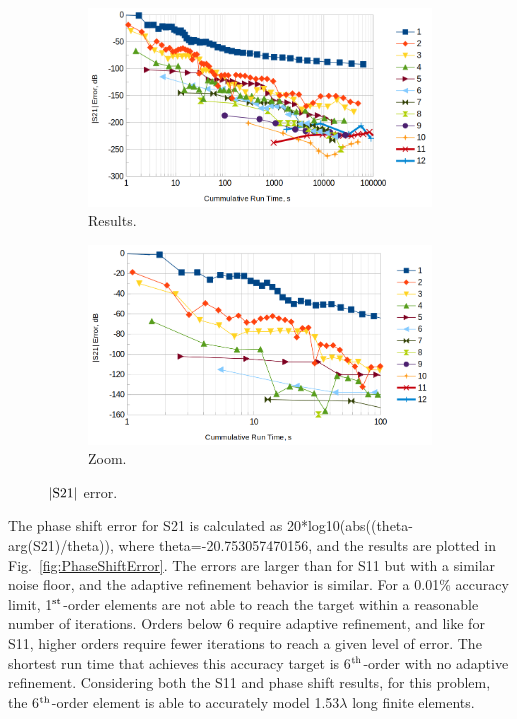 \documentclass[titlepage]{article}
\renewcommand\_{\textunderscore\linebreak[1]}
\begin{document}
\begin{figure}[H]
  \centering
  \begin{subfigure}[t]{0.49\textwidth}
     \includegraphics[width=1\linewidth]{../regression/OpenParEM3D/WR90/straight_study/screenshots/S21Error}
     \caption{Results.}
  \end{subfigure}
  \begin{subfigure}[t]{0.49\textwidth}
     \includegraphics[width=1\linewidth]{../regression/OpenParEM3D/WR90/straight_study/screenshots/S21ErrorZoom}
     \caption{Zoom.}
  \end{subfigure}
  \caption{$|\textnormal{S21}|$ error.}
  \label{fig:S21Error}
\end{figure}

The phase shift error for S21 is calculated as 20*log10(abs((theta-arg(S21)/theta)), where \newline theta=-20.753057470156, and the results are plotted in Fig.~\ref{fig:PhaseShiftError}.  The errors are larger than for S11 but with a similar noise floor, and the adaptive refinement behavior is similar.  For a 0.01\% accuracy limit, 1$^{\textnormal{st}}$-order elements are not able to reach the target within a reasonable number of iterations.  Orders below 6 require adaptive refinement, and like for S11, higher orders require fewer iterations to reach a given level of error.  The shortest run time that achieves this accuracy target is 6$^{\textnormal{th}}$-order with no adaptive refinement. Considering both the S11 and phase shift results, for this problem, the 6$^{\textnormal{th}}$-order element is able to accurately model 1.53$\lambda$ long finite elements.
\end{document}
